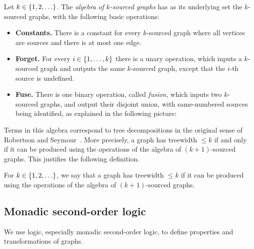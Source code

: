     
    \begin{definition}
         Let $k \in \{1,2,\ldots\}$. The \emph{algebra of $k$-sourced graphs} has as its underlying set the  $k$-sourced graphs,  with the following basic operations:
            \begin{itemize}
                \item {\bf Constants.} There is a constant for every $k$-sourced graph where all vertices are sources and there is at most one edge.
                \item {\bf Forget.} For every $i \in \{1,\ldots,k\}$ there is a unary operation, which inputs a $k$-sourced graph and outputs the same $k$-sourced graph, except that the $i$-th source is undefined. 
                \item {\bf Fuse.} There is one binary operation, called \emph{fusion}, which inputs two $k$-sourced graphs, and output their disjoint union, with same-numbered sources being identified, as explained in the following picture:
            \end{itemize}
        \end{definition}
    
        Terms in this algebra correspond to tree decompositions in the original sense of Robertson and Seymour~\cite[Section 12.3]{diestel}. More precisely, a graph has treewidth $\leq k$  if and only if it can be produced using the operations of the algebra of $(k+1)$-sourced graphs. This justifies the following definition.


  \begin{definition}[Treewidth]
        For $k \in \{1,2,\ldots\}$, we say that a  graph has treewidth  $\le  k$ if it can be produced using the operations of the algebra of $(k+1)$-sourced graphs.
    \end{definition}

  
    

    \subsection{Monadic second-order logic}
    We  use logic, especially monadic second-order logic, to define properties and transformations of graphs. 

